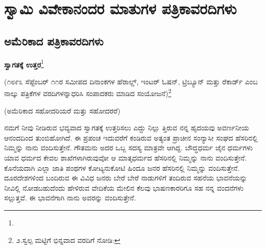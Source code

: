 

\part{ಸ್ವಾಮಿ ವಿವೇಕಾನಂದರ ಮಾತುಗಳ ಪತ್ರಿಕಾವರದಿಗಳು}







\chapter{ಅಮೆರಿಕಾದ ಪತ್ರಿಕಾವರದಿಗಳು}

\begin{center}
\textbf{ಸ್ವಾಗತಕ್ಕೆ ಉತ್ತರ}\footnote{}
\end{center}

(೧೮೯೩ ಸೆಪ್ಟೆಂಬರ್ ೧೧ರ ಸಮೀಪದ ದಿನಾಂಕಗಳ ಹೆರಾಲ್ಡ್, ಇಂಟರ್ ಓಷನ್, ಟ್ರಿಬ್ಯೂನ್ ಮತ್ತು ರೆಕಾರ್ಡ್ ಎಂಬ ನಾಲ್ಕು ಪತ್ರಿಕೆಗಳ ವರದಿಗಳನ್ನಾಧರಿಸಿ ಸಂಪಾದಕರು ಮಾಡಿದ ಸಂಯೋಜನೆ)\footnote{೨.ಸ್ವಲ್ಪ ಮಟ್ಟಿಗೆ ಭಿನ್ನವಾದ ವರದಿಗೆ ನೋಡಿ: }

\begin{center}
(ಅಮೆರಿಕಾದ ಸಹೋದರಿಯರೆ ಮತ್ತು ಸಹೋದರರೆ)
\end{center}

ನಮಗೆ ನೀವು ನೀಡಿರುವ ಭವ್ಯವಾದ ಸ್ವಾಗತಕ್ಕೆ ಉತ್ತರಿಸಲು ಎದ್ದು ನಿಲ್ಲು ತ್ತಿರುವ ನನ್ನ ಹೃದಯವು ಅವರ್ಣನೀಯ ಆನಂದದಿಂದ ತುಂಬಿಹೋಗಿದೆ. ಈ ಪ್ರಪಂಚ ಇದುವರೆಗೆ ಕಂಡಿರುವ ಅತ್ಯಂತ ಪ್ರಾಚೀನ ಸಂನ್ಯಾಸೀ ಸಂಘದ ಹೆಸರಿನಲ್ಲಿ ನಿಮ್ಮನ್ನು ನಾನು ವಂದಿಸುತ್ತೇನೆ. ಗೌತಮನು ಅದರ ಒಬ್ಬ ಸದಸ್ಯ ಮಾತ್ರವೇ ಆಗಿದ್ದ. ಬೌದ್ಧಧರ್ಮ ಜೈನ ಧರ್ಮಗಳು ಯಾವ ಧರ್ಮದ ಕೇವಲ ಶಾಖೆಗಳಾಗಿರುವುವೋ ಆ ಮಾತೃಧರ್ಮದ ಹೆಸರಿನಲ್ಲಿ ನಿಮ್ಮನ್ನು ನಾನು ವಂದಿಸುತ್ತೇನೆ. ಕೊನೆಯದಾಗಿ ಎಲ್ಲಾ ಜಾತಿ ಪಂಥಗಳ ಕೋಟ್ಯನುಕೋಟಿ ಹಿಂದೂ ಜನರ ಹೆಸರಿನಲ್ಲಿ ನಿಮ್ಮನ್ನು ವಂದಿಸುತ್ತೇನೆ. ದೂರದೇಶಗಳಿಂದ ಬಂದಿರುವ ಈ ವಿವಿಧ ಜನರು ಬೇರೆ ಬೇರೆ ನಾಡುಗಳಿಗೆ ತಂದಿರುವ ಸಹನೆಯ ಭಾವನೆಯನ್ನು ನೀವಿಲ್ಲಿ ನೋಡಬಹುದೆಂದು ಹೇಳಿರುವ ವೇದಿಕೆಯ ಮೇಲಿನ ಕೆಲವು ಭಾಷಣಕಾರರಿಗೂ ಸಹ ನನ್ನ ವಂದನೆಗಳು ಸಲ್ಲುತ್ತವೆ. ಈ ಭಾವನೆಗಾಗಿ ನಾನು ಅವರನ್ನು ವಂದಿಸುತ್ತೇನೆ.

